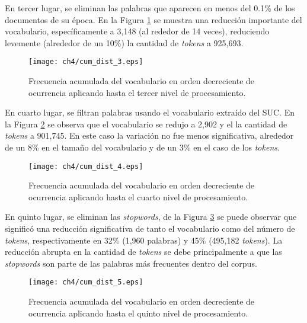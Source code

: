 En tercer lugar, se eliminan las palabras que aparecen en menos del 0.1\% de los documentos de su época. En la Figura \ref{img:cum_dist3} se muestra una reducción importante del vocabulario, específicamente a 3,148 (al rededor de 14 veces), reduciendo levemente  (alrededor de un 10\%) la cantidad de \textit{tokens} a 925,693.\\

\begin{figure}
    \centering
    \texttt{[image: ch4/cum\_dist\_3.eps]}
    \caption{Frecuencia acumulada del vocabulario en orden decreciente de ocurrencia aplicando hasta el tercer nivel de procesamiento.}
    \label{img:cum_dist3}
\end{figure}

En cuarto lugar, se filtran palabras usando el vocabulario extraído del SUC. En la Figura \ref{img:cum_dist4} se observa que el vocabulario se redujo a 2,902 y el la cantidad de \textit{tokens} a 901,745. En este caso la variación no fue menos significativa, alrededor de un 8\% en el tamaño del vocabulario y de un 3\% en el caso de los \textit{tokens}.\\

\begin{figure}
    \centering
    \texttt{[image: ch4/cum\_dist\_4.eps]}
    \caption{Frecuencia acumulada del vocabulario en orden decreciente de ocurrencia aplicando hasta el cuarto nivel de procesamiento.}
    \label{img:cum_dist4}
\end{figure}

En quinto lugar, se eliminan las \textit{stopwords}, de la Figura \ref{img:cum_dist5} se puede observar que significó una reducción significativa de tanto el vocabulario como del número de \textit{tokens}, respectivamente en 32\% (1,960 palabras) y 45\% (495,182 \textit{tokens}). La reducción abrupta en la cantidad de \textit{tokens} se debe principalmente a que las \textit{stopwords} son parte de las palabras más frecuentes dentro del corpus.\\

\begin{figure}
    \centering
    \texttt{[image: ch4/cum\_dist\_5.eps]}
    \caption{Frecuencia acumulada del vocabulario en orden decreciente de ocurrencia aplicando hasta el quinto nivel de procesamiento.}
    \label{img:cum_dist5}
\end{figure}

